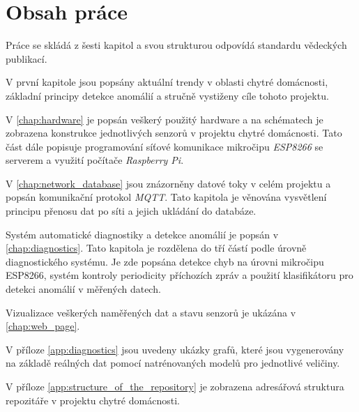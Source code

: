 \section*{Obsah práce} \label{sec:thesis_outline}
Práce se skládá z šesti kapitol a svou strukturou odpovídá standardu vědeckých publikací. \par
V první kapitole jsou popsány aktuální trendy v oblasti chytré domácnosti, základní principy detekce anomálií a stručně vystiženy cíle tohoto projektu. \par
V \cref{chap:hardware} je popsán veškerý použitý hardware a na schématech je zobrazena konstrukce jednotlivých senzorů v projektu chytré domácnosti. Tato část dále popisuje programování síťové komunikace mikročipu \textit{ESP8266} se serverem a využití počítače \textit{Raspberry Pi}. \par 
V \cref{chap:network_database} jsou znázorněny datové toky v celém projektu a popsán komunikační protokol \textit{MQTT}. Tato kapitola je věnována vysvětlení principu přenosu dat po síti a jejich ukládání do databáze. \par
Systém automatické diagnostiky a detekce anomálií je popsán v \cref{chap:diagnostics}. Tato kapitola je rozdělena do tří částí podle úrovně diagnostického systému. Je zde popsána detekce chyb na úrovni mikročipu ESP8266, systém kontroly periodicity příchozích zpráv a použití klasifikátoru pro detekci anomálií v měřených datech. \par
Vizualizace veškerých naměřených dat a stavu senzorů je ukázána v \cref{chap:web_page}. \par
V příloze \ref{app:diagnostics} jsou uvedeny ukázky grafů, které jsou vygenerovány na základě reálných dat pomocí natrénovaných modelů pro jednotlivé veličiny. \par
V příloze \ref{app:structure_of_the_repository} je zobrazena adresářová struktura repozitáře v projektu chytré domácnosti. 
